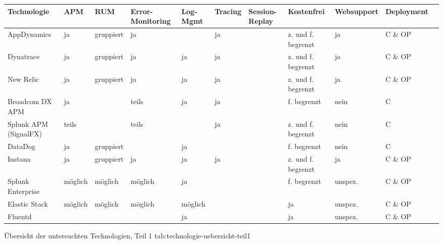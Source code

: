 %
{
\begin{tabular}{|p{2.25cm}|p{1.1cm}|p{1.4cm}|p{1.5cm}|p{1.1cm}|p{1.25cm}|p{1.25cm}|p{1.5cm}|p{1.25cm}|p{1.25cm}|p{1.35cm}|}
\hline
Technologie & APM & RUM & Error-Mo\-ni\-tor\-ing & Log-Mgmt & Tracing & Session-Replay & Kosten\-frei & Web\-support & Deploy\-ment \\
\hline
\hline
AppDynamics & ja & gruppiert & ja &  & ja &  & z. und f. begrenzt & ja & C \& OP \\
\hline
Dynatrace & ja & gruppiert & ja & ja & ja &  & z. und f. begrenzt & ja & C \& OP \\
\hline
New Relic & ja & gruppiert & ja & ja & ja &  & z. und f. begrenzt & ja & C \& OP \\
\hline
Broadcom DX APM & ja &  & teils & ja & ja &  & f. begrenzt & nein & C \\
\hline
Splunk APM (SignalFX) & teils &  & teils &  & ja &  & z. und f. begrenzt & nein & C \\
\hline
DataDog & ja & gruppiert &  & ja &  &  & f. begrenzt & nein & C \\
\hline
Instana & ja & gruppiert & ja & ja & ja &  & z. und f. begrenzt & ja & C \& OP \\
\hline
\hline
Splunk Enterprise & möglich & möglich & möglich & ja &  &  & f. begrenzt & unspez. & C \& OP \\
\hline
Elastic Stack & möglich & möglich & möglich & möglich &  &  & ja & unspez. & C \& OP \\
\hline
Fluentd &  &  &  & ja &  &  & ja & unspez. & C \& OP \\
\hline
\end{tabular}
}
{Übersicht der untersuchten Technologien, Teil 1}
{tab:technologie-uebersicht-teil1}

\newpage

